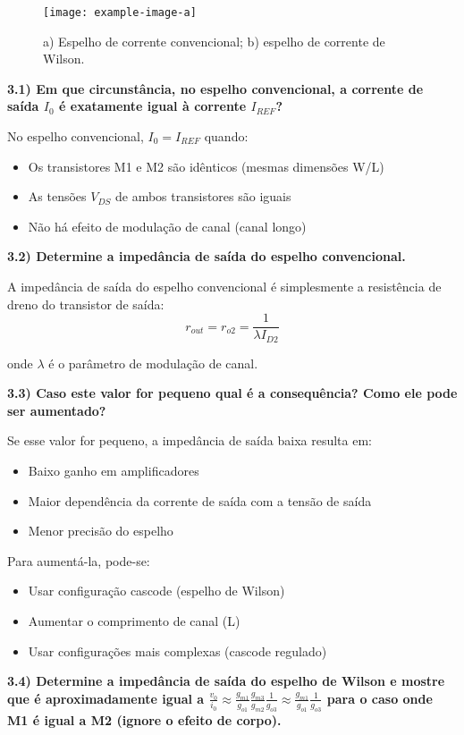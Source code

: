 ﻿\documentclass[12pt,a4paper]{article}
\begin{document}
\begin{figure}[H]
    \centering
    \texttt{[image: example-image-a]}
    \caption{a) Espelho de corrente convencional; b) espelho de corrente de Wilson.}
    \label{fig:espelhos_corrente}
\end{figure}

\textbf{3.1) Em que circunstância, no espelho convencional, a corrente de saída $I_0$ é exatamente igual à corrente $I_{REF}$?}

No espelho convencional, $I_0 = I_{REF}$ quando:
\begin{itemize}
    \item Os transistores M1 e M2 são idênticos (mesmas dimensões W/L)
    \item As tensões $V_{DS}$ de ambos transistores são iguais
    \item Não há efeito de modulação de canal (canal longo)
\end{itemize}

\textbf{3.2) Determine a impedância de saída do espelho convencional.}

A impedância de saída do espelho convencional é simplesmente a resistência de dreno do transistor de saída:
$$r_{out} = r_{o2} = \frac{1}{\lambda I_{D2}}$$

onde $\lambda$ é o parâmetro de modulação de canal.

\textbf{3.3) Caso este valor for pequeno qual é a consequência? Como ele pode ser aumentado?}

Se esse valor for pequeno, a impedância de saída baixa resulta em:
\begin{itemize}
    \item Baixo ganho em amplificadores
    \item Maior dependência da corrente de saída com a tensão de saída
    \item Menor precisão do espelho
\end{itemize}

Para aumentá-la, pode-se:
\begin{itemize}
    \item Usar configuração cascode (espelho de Wilson)
    \item Aumentar o comprimento de canal (L)
    \item Usar configurações mais complexas (cascode regulado)
\end{itemize}

\textbf{3.4) Determine a impedância de saída do espelho de Wilson e mostre que é aproximadamente igual a $\frac{v_{0}}{i_{0}} \approx \frac{g_{m1}}{g_{o1}} \frac{g_{m3}}{g_{m2}} \frac{1}{g_{o3}} \approx \frac{g_{m1}}{g_{o1}} \frac{1}{g_{o3}}$ para o caso onde M1 é igual a M2 (ignore o efeito de corpo).}
\end{document}
